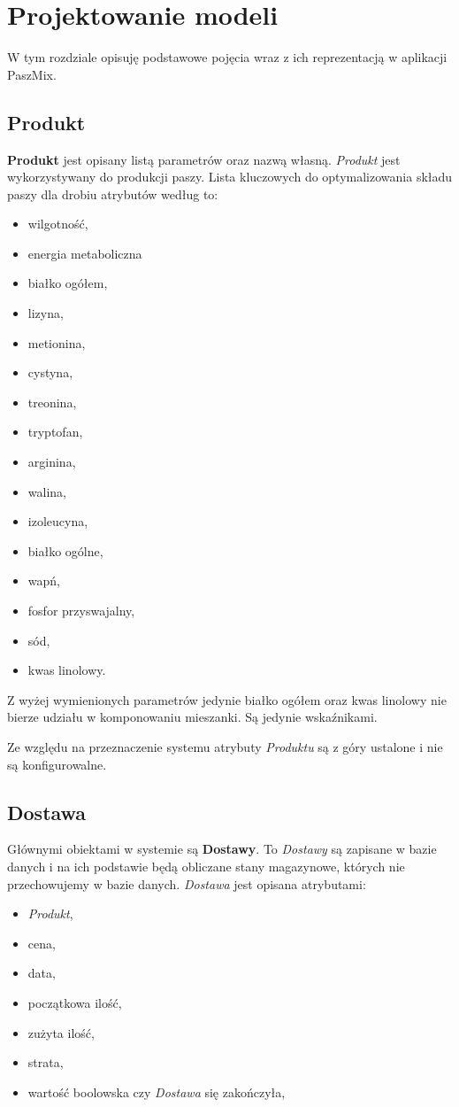 \documentclass[shortabstract]{iithesis}
\begin{document}
\chapter{Projektowanie modeli}

W tym rozdziale opisuję podstawowe pojęcia wraz z ich reprezentacją w aplikacji PaszMix.

\section{Produkt}\label{s:produkt}
\textbf{Produkt} jest opisany listą parametrów oraz nazwą własną. \textit{Produkt} jest wykorzystywany do produkcji paszy. Lista kluczowych do optymalizowania składu paszy dla drobiu atrybutów według \cite{ZZ} to:
\begin{itemize}
	\item 	wilgotność,
	\item	energia metaboliczna
	\item 	białko ogółem,
	\item	lizyna, 
	\item	metionina,
	\item 	cystyna, 
	\item	treonina, 
	\item	tryptofan, 
	\item	arginina, 
	\item	walina, 
	\item	izoleucyna, 
	\item	białko ogólne, 
	\item	wapń, 
    	\item 	fosfor przyswajalny, 
    	\item	sód,
    	\item	kwas linolowy.
\end{itemize}

Z wyżej wymienionych parametrów jedynie białko ogółem oraz kwas linolowy nie bierze udziału w komponowaniu mieszanki. Są jedynie wskaźnikami.

Ze względu na przeznaczenie systemu atrybuty \textit{Produktu} są z góry ustalone i nie są konfigurowalne.

\section{Dostawa}
Głównymi obiektami w systemie są \textbf{Dostawy}. To \textit{Dostawy} są zapisane w bazie danych i na ich podstawie będą obliczane stany magazynowe, których nie przechowujemy w bazie danych.
\textit{Dostawa} jest opisana atrybutami:
\begin{itemize}
	\item \textit{Produkt},
	\item cena,
	\item data,
	\item początkowa ilość,
	\item zużyta ilość,
	\item strata,
	\item wartość boolowska czy \textit{Dostawa} się zakończyła,
\end{itemize}
\end{document}
